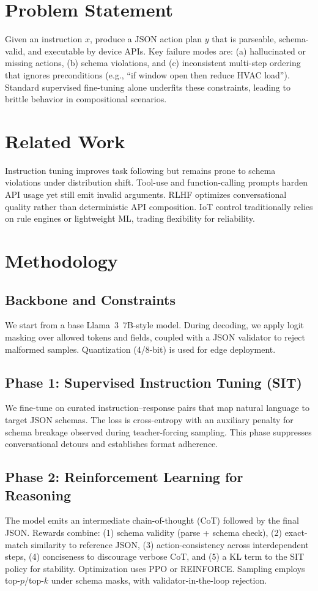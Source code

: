 \documentclass[conference]{IEEEtran}
\begin{document}
\section{Problem Statement}
Given an instruction $x$, produce a JSON action plan $y$ that is parseable, schema-valid, and executable by device APIs. Key failure modes are: (a) hallucinated or missing actions, (b) schema violations, and (c) inconsistent multi-step ordering that ignores preconditions (e.g., ``if window open then reduce HVAC load''). Standard supervised fine-tuning alone underfits these constraints, leading to brittle behavior in compositional scenarios.

\section{Related Work}
Instruction tuning improves task following but remains prone to schema violations under distribution shift. Tool-use and function-calling prompts harden API usage yet still emit invalid arguments. RLHF optimizes conversational quality rather than deterministic API composition. IoT control traditionally relies on rule engines or lightweight ML, trading flexibility for reliability.

\section{Methodology}
\subsection{Backbone and Constraints}
We start from a base Llama~3~7B-style model. During decoding, we apply logit masking over allowed tokens and fields, coupled with a JSON validator to reject malformed samples. Quantization (4/8-bit) is used for edge deployment.

\subsection{Phase 1: Supervised Instruction Tuning (SIT)}
We fine-tune on curated instruction--response pairs that map natural language to target JSON schemas. The loss is cross-entropy with an auxiliary penalty for schema breakage observed during teacher-forcing sampling. This phase suppresses conversational detours and establishes format adherence.

\subsection{Phase 2: Reinforcement Learning for Reasoning}
The model emits an intermediate chain-of-thought (CoT) followed by the final JSON. Rewards combine: (1) schema validity (parse + schema check), (2) exact-match similarity to reference JSON, (3) action-consistency across interdependent steps, (4) conciseness to discourage verbose CoT, and (5) a KL term to the SIT policy for stability. Optimization uses PPO or REINFORCE. Sampling employs top-$p$/top-$k$ under schema masks, with validator-in-the-loop rejection.
\end{document}
